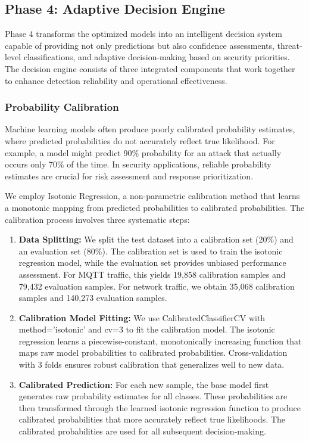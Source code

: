 \documentclass[conference]{IEEEtran}
\begin{document}
\subsection{Phase 4: Adaptive Decision Engine}

Phase 4 transforms the optimized models into an intelligent decision system capable of providing not only predictions but also confidence assessments, threat-level classifications, and adaptive decision-making based on security priorities. The decision engine consists of three integrated components that work together to enhance detection reliability and operational effectiveness.

\subsubsection{Probability Calibration}

Machine learning models often produce poorly calibrated probability estimates, where predicted probabilities do not accurately reflect true likelihood. For example, a model might predict 90\% probability for an attack that actually occurs only 70\% of the time. In security applications, reliable probability estimates are crucial for risk assessment and response prioritization.

We employ Isotonic Regression, a non-parametric calibration method that learns a monotonic mapping from predicted probabilities to calibrated probabilities. The calibration process involves three systematic steps:

\begin{enumerate}
\item \textbf{Data Splitting:} We split the test dataset into a calibration set (20\%) and an evaluation set (80\%). The calibration set is used to train the isotonic regression model, while the evaluation set provides unbiased performance assessment. For MQTT traffic, this yields 19,858 calibration samples and 79,432 evaluation samples. For network traffic, we obtain 35,068 calibration samples and 140,273 evaluation samples.

\item \textbf{Calibration Model Fitting:} We use CalibratedClassifierCV with method='isotonic' and cv=3 to fit the calibration model. The isotonic regression learns a piecewise-constant, monotonically increasing function that maps raw model probabilities to calibrated probabilities. Cross-validation with 3 folds ensures robust calibration that generalizes well to new data.

\item \textbf{Calibrated Prediction:} For each new sample, the base model first generates raw probability estimates for all classes. These probabilities are then transformed through the learned isotonic regression function to produce calibrated probabilities that more accurately reflect true likelihoods. The calibrated probabilities are used for all subsequent decision-making.
\end{enumerate}
\end{document}
